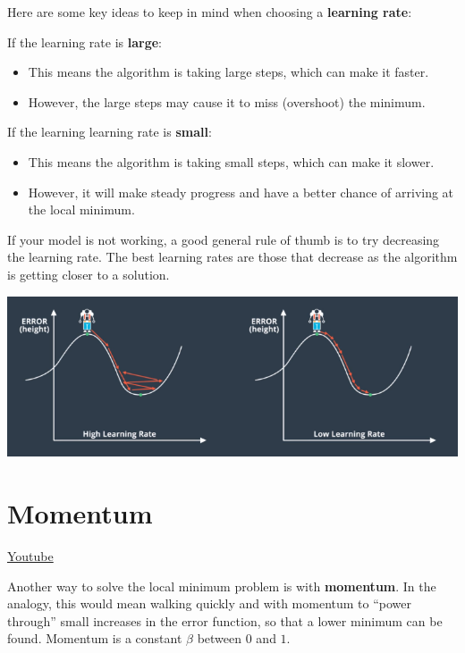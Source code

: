 Here are some key ideas to keep in mind when choosing a \textbf{learning rate}:

If the learning rate is \textbf{large}:

\begin{itemize}
    \item This means the algorithm is taking large steps, which can make it faster.
    \item However, the large steps may cause it to miss (overshoot) the minimum.
\end{itemize}
If the learning learning rate is \textbf{small}:

\begin{itemize}
    \item This means the algorithm is taking small steps, which can make it slower.
    \item However, it will make steady progress and have a better chance of arriving at the local minimum.
\end{itemize}
If your model is not working, a good general rule of thumb is to try decreasing the learning rate. The best learning rates are those that decrease as the algorithm is getting closer to a solution.

\includegraphics[width=1\linewidth]{img//intro//trainingNN/training-considerations-26.png}

\section{Momentum}
\href{https://www.youtube.com/watch?v=r-rYz_PEWC8&t=1s&ab_channel=Udacity}{Youtube} \newline
 
Another way to solve the local minimum problem is with \textbf{momentum}. In the analogy, this would mean walking quickly and with momentum to “power through” small increases in the error function, so that a lower minimum can be found. Momentum is a constant \(\beta\) between \(0\) and \(1\). \newline

